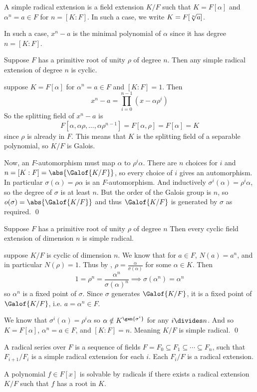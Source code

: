 \bdefn

    A {\emphcolor simple radical extension} is a field extension $K/F$ such that $K=F[\alpha]$ and $\alpha^n=a\in F$ for $n=[K:F]$.
    In such a case, we write $K=F[\root n\of a]$.

\edefn

In such a case, $x^n-a$ is the minimal polynomial of $\alpha$ since it has degree $n=[K:F]$.

\bprop

    Suppose $F$ has a primitive root of unity $\rho$ of degree $n$.
    Then any simple radical extension of degree $n$ is cyclic.

\eprop

\Proof suppose $K=F[\alpha]$ for $\alpha^n=a\in F$ and $[K:F]=1$.
Then
$$ x^n - a = \prod_{i=0}^{n-1}(x-\alpha\rho^i) $$
So the splitting field of $x^n-a$ is
$$ F[\alpha,\alpha\rho,\dots,\alpha\rho^{n-1}] = F[\alpha,\rho] = F[\alpha] = K $$
since $\rho$ is already in $F$.
This means that $K$ is the splitting field of a separable polynomial, so $K/F$ is Galois.

Now, an $F$-automorphism must map $\alpha$ to $\rho^i\alpha$.
There are $n$ choices for $i$ and $n=[K:F]=\abs{\Galof{K/F}}$, so every choice of $i$ gives an automorphism.
In particular $\sigma(\alpha)=\rho\alpha$ is an $F$-automorphism.
And inductively $\sigma^i(\alpha)=\rho^i\alpha$, so the degree of $\sigma$ is at least $n$.
But the order of the Galois group is $n$, so $o(\sigma)=\abs{\Galof{K/F}}$ and thus $\Galof{K/F}$ is generated by $\sigma$ as required.
\qed

\bthrm[title=Kummer's Theorem, name=kummer]

    Suppose $F$ has a primitive root of unity $\rho$ of degree $n$
    Then every cyclic field extension of dimension $n$ is simple radical.

\ethrm

\Proof suppose $K/F$ is cyclic of dimension $n$.
We know that for $a\in F$, $N(a)=a^n$, and in particular $N(\rho)=1$.
Thus by , $\rho=\frac\alpha{\sigma(\alpha)}$ for some $\alpha\in K$.
Then
$$ 1 = \rho^n = \frac{\alpha^n}{\sigma(\alpha)^n} \implies \sigma(\alpha^n) = \alpha^n $$
so $\alpha^n$ is a fixed point of $\sigma$.
Since $\sigma$ generates $\Galof{K/F}$, it is a fixed point of $\Galof{K/F}$, i.e. $a=\alpha^n\in F$.

We know that $\sigma^i(\alpha)=\rho^i\alpha$ so $\alpha\notin K^{\gen{\sigma^i}}$ for any $i\divides n$.
And so $K=F[\alpha]$, $\alpha^n=a\in F$, and $[K:F]=n$.
Meaning $K/F$ is simple radical.
\qed

\bdefn

    A {\emphcolor radical series} over $F$ is a sequence of fields $F=F_0\subseteq F_1\subseteq\cdots\subseteq F_n$, such that $F_{i+1}/F_i$ is a simple radical extension for each $i$.
    Each $F_i/F$ is a {\emphcolor radical extension}.

\edefn

\bdefn

    A polynomial $f\in F[x]$ is {\emphcolor solvable by radicals} if there exists a radical extension $K/F$ such that $f$ has a root in $K$.

\edefn

